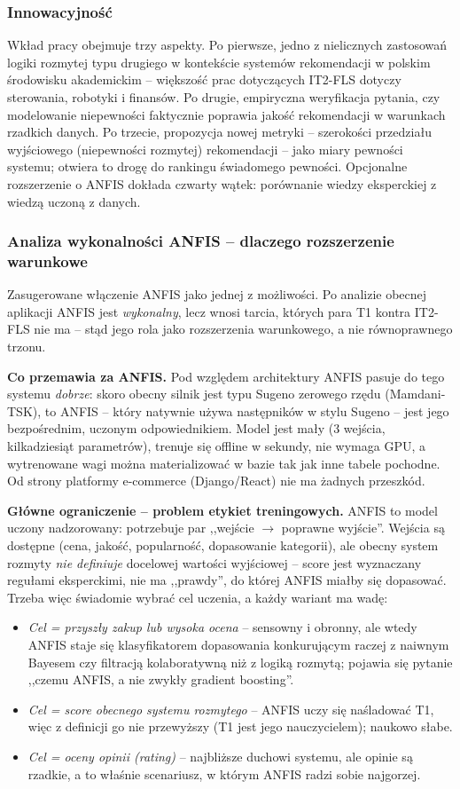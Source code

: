 \documentclass[12pt,a4paper]{article}
\newcommand{\topicsection}[1]{\subsubsection*{#1}}
\begin{document}
\topicsection{Innowacyjność}
Wkład pracy obejmuje trzy aspekty. Po pierwsze, jedno z nielicznych zastosowań logiki rozmytej typu drugiego w kontekście systemów rekomendacji w polskim środowisku akademickim -- większość prac dotyczących IT2-FLS dotyczy sterowania, robotyki i finansów. Po drugie, empiryczna weryfikacja pytania, czy modelowanie niepewności faktycznie poprawia jakość rekomendacji w warunkach rzadkich danych. Po trzecie, propozycja nowej metryki -- szerokości przedziału wyjściowego (niepewności rozmytej) rekomendacji -- jako miary pewności systemu; otwiera to drogę do rankingu świadomego pewności. Opcjonalne rozszerzenie o ANFIS dokłada czwarty wątek: porównanie wiedzy eksperckiej z wiedzą uczoną z danych.

\topicsection{Analiza wykonalności ANFIS -- dlaczego rozszerzenie warunkowe}
Zasugerowane włączenie ANFIS jako jednej z możliwości. Po analizie obecnej aplikacji ANFIS jest \emph{wykonalny}, lecz wnosi tarcia, których para T1 kontra IT2-FLS nie ma -- stąd jego rola jako rozszerzenia warunkowego, a nie równoprawnego trzonu.

\textbf{Co przemawia za ANFIS.} Pod względem architektury ANFIS pasuje do tego systemu \emph{dobrze}: skoro obecny silnik jest typu Sugeno zerowego rzędu (Mamdani-TSK), to ANFIS -- który natywnie używa następników w stylu Sugeno -- jest jego bezpośrednim, uczonym odpowiednikiem. Model jest mały (3 wejścia, kilkadziesiąt parametrów), trenuje się offline w sekundy, nie wymaga GPU, a wytrenowane wagi można materializować w bazie tak jak inne tabele pochodne. Od strony platformy e-commerce (Django/React) nie ma żadnych przeszkód.

\textbf{Główne ograniczenie -- problem etykiet treningowych.} ANFIS to model uczony nadzorowany: potrzebuje par ,,wejście $\rightarrow$ poprawne wyjście''. Wejścia są dostępne (cena, jakość, popularność, dopasowanie kategorii), ale obecny system rozmyty \emph{nie definiuje} docelowej wartości wyjściowej -- score jest wyznaczany regułami eksperckimi, nie ma ,,prawdy'', do której ANFIS miałby się dopasować. Trzeba więc świadomie wybrać cel uczenia, a każdy wariant ma wadę:
\begin{itemize}
\item \emph{Cel = przyszły zakup lub wysoka ocena} -- sensowny i obronny, ale wtedy ANFIS staje się klasyfikatorem dopasowania konkurującym raczej z naiwnym Bayesem czy filtracją kolaboratywną niż z logiką rozmytą; pojawia się pytanie ,,czemu ANFIS, a nie zwykły gradient boosting''.
\item \emph{Cel = score obecnego systemu rozmytego} -- ANFIS uczy się naśladować T1, więc z definicji go nie przewyższy (T1 jest jego nauczycielem); naukowo słabe.
\item \emph{Cel = oceny opinii (rating)} -- najbliższe duchowi systemu, ale opinie są rzadkie, a to właśnie scenariusz, w którym ANFIS radzi sobie najgorzej.
\end{itemize}
\end{document}
